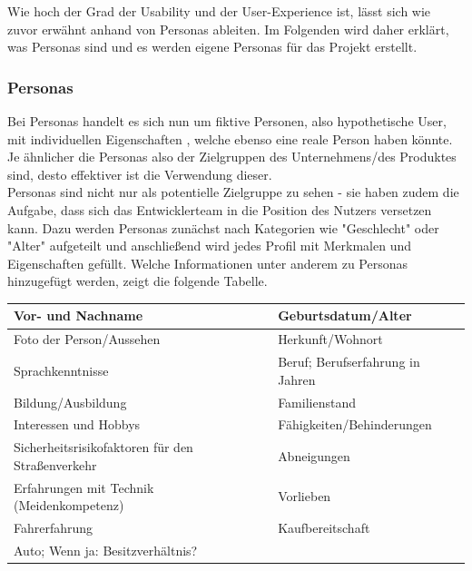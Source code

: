 Wie hoch der Grad der Usability und der User-Experience ist, lässt sich wie zuvor erwähnt anhand von Personas ableiten. Im Folgenden wird daher erklärt, was Personas sind und es werden eigene Personas für das Projekt erstellt.

\subsubsection{Personas}\label{personas}
Bei Personas handelt es sich nun um fiktive Personen, also hypothetische User, mit individuellen Eigenschaften \cite[]{seibert2008}, welche ebenso eine reale Person haben könnte. Je ähnlicher die Personas also der Zielgruppen des Unternehmens/des Produktes sind, desto effektiver ist die Verwendung dieser.\\
Personas sind nicht nur als potentielle Zielgruppe zu sehen - sie haben zudem die Aufgabe, dass sich das Entwicklerteam in die Position des Nutzers versetzen kann. Dazu werden Personas zunächst nach Kategorien wie "Geschlecht" oder "Alter"  aufgeteilt und anschließend wird jedes Profil mit Merkmalen und Eigenschaften gefüllt. Welche Informationen unter anderem zu Personas hinzugefügt werden, zeigt die folgende Tabelle.
\begin{center}
	\begin{tabular}{| l | l |}
		\hline
		\cellcolor{blue!25}Vor- und Nachname & \cellcolor{blue!25}Geburtsdatum/Alter\\
		\hline
		\cellcolor{blue!25}Foto der Person/Aussehen & \cellcolor{blue!25}Herkunft/Wohnort\\
		\hline
		\cellcolor{blue!25}Sprachkenntnisse & \cellcolor{red!25}Beruf; Berufserfahrung in Jahren\\
		\hline
		\cellcolor{blue!25}Bildung/Ausbildung & \cellcolor{blue!25}Familienstand\\
		\hline
		\cellcolor{red!25}Interessen und Hobbys & \cellcolor{red!25}Fähigkeiten/Behinderungen\\
		\hline
		\cellcolor{green!25}Sicherheitsrisikofaktoren für den Straßenverkehr &\cellcolor{green!25}Abneigungen\\
		\hline
		\cellcolor{green!25}Erfahrungen mit Technik (Meidenkompetenz) & 
		\cellcolor{green!25}Vorlieben \\
		\hline
		\cellcolor{green!25}Fahrerfahrung & \cellcolor{blue!25}Kaufbereitschaft\\
		\hline
		\cellcolor{green!25}Auto; Wenn ja: Besitzverhältnis? & \\
		\hline
	\end{tabular}
\end{center}
